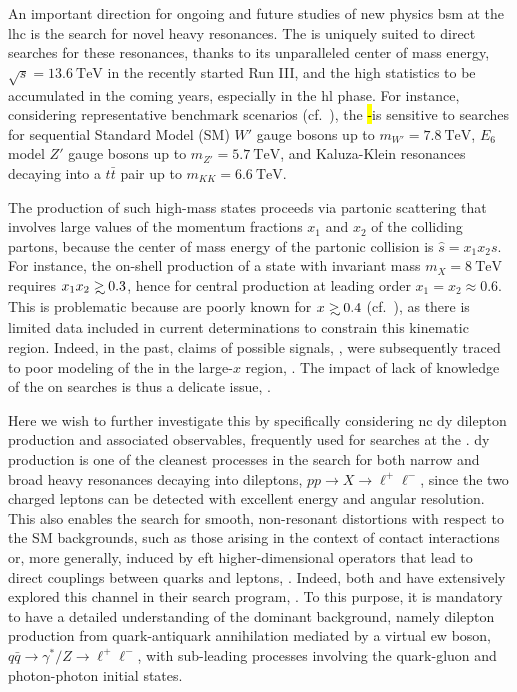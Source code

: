 
An important direction for ongoing and future studies of  new physics
\acrfull{bsm} at the \acrfull{lhc} is the search for novel heavy resonances.
%
The \lhc is uniquely suited to direct searches for these resonances, thanks to
its unparalleled center of mass energy,
$\sqrt{s}=\SI{13.6}{\tera\electronvolt}$ in the recently started  Run III, and
the high statistics to be accumulated in the coming years, especially in the
\acrfull{hl} phase.
%
For instance, considering representative benchmark \bsm scenarios (cf.\
\cite{CidVidal:2018eel}), the \hl-\lhc is sensitive to  searches for sequential
Standard Model (SM)  $W'$ gauge bosons  up to
$m_{W'}=\SI{7.8}{\tera\electronvolt}$, $E_6$ model $Z'$ gauge bosons up to
$m_{Z'}=\SI{5.7}{\tera\electronvolt}$, and Kaluza-Klein resonances decaying
into a $t\bar{t}$ pair up to $m_{KK}=\SI{6.6}{\tera\electronvolt}$.

The production of such high-mass states proceeds via partonic scattering that
involves large  values of the momentum fractions $x_1$ and $x_2$ of the
colliding partons, because the center of mass energy of the partonic collision
is $\hat s= x_1 x_2 s$.
%
For instance, the on-shell production of a state with invariant mass
$m_{X}=\SI{8}{\tera\electronvolt}$ requires $x_1x_2 \gsim 0.3$, hence for
central production at leading order $x_1=x_2\approx 0.6$. 
This is problematic because \pdfs are poorly known for $x\gsim 0.4$ (cf.\
\cite{Gao:2017yyd,Kovarik:2019xvh}), as there is limited data included in
current \pdf determinations to constrain this kinematic region.
%
Indeed, in the past, claims of possible \bsm signals, \cite{CDF:1996yow}, were
subsequently traced to poor modeling of the \pdfs in the large-$x$ region,
\cite{Lai:1996mg}.
%
The impact of lack of knowledge of the \pdfs on \bsm searches is thus a
delicate issue, \cite{Beenakker:2015rna}.

Here we wish to further investigate this by specifically considering
\acrfull{nc} \acrfull{dy} dilepton production and associated observables,
frequently  used for \bsm searches at the \lhc.
%
\nc \acrlong{dy} production is one of the cleanest processes in the search for 
both narrow and broad heavy resonances decaying into dileptons, $pp \to X \to
\ell^+\ell^-$, since  the two charged leptons can be detected with excellent
energy and angular resolution.
%
This also enables the search for smooth, non-resonant distortions with respect
to the SM backgrounds, such as those arising in the context of contact
interactions  or, more generally, induced by \acrfull{eft} higher-dimensional
operators that lead to  direct couplings between quarks and
leptons, \cite{Ethier:2021bye,Dawson:2018dxp,Ellis:2020unq,Greljo:2021kvv}.
Indeed, both \atlas and \cms have extensively explored this channel in their
\bsm search program,
\cite{ATLAS:2014gys,ATLAS:2020yat,ATLAS:2019erb,CMS:2021ctt,ATLAS:2021mla,CMS:2018nlk}.
To this purpose, it is mandatory to have a detailed understanding of the
dominant \sm background, namely dilepton production from quark-antiquark
annihilation mediated by a virtual \acrfull{ew} boson, $q\bar{q} \to 
\gamma^*/Z \to \ell^+\ell^-$, with sub-leading processes involving the
quark-gluon and photon-photon initial states.

